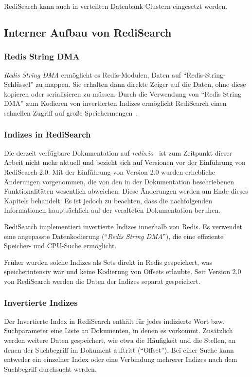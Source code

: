 RediSearch kann auch in verteilten Datenbank-Clustern eingesetzt werden.
\subsection{Interner Aufbau von RediSearch}
\subsubsection{Redis String DMA} %
\emph{Redis String DMA} ermöglicht es Redis-Modulen, Daten auf \enquote{Redis-String-Schlüssel} zu mappen. Sie erhalten dann direkte Zeiger auf die Daten, ohne diese kopieren oder serialisieren zu müssen.
Durch die Verwendung von \enquote{Redis String DMA} zum Kodieren von invertierten Indizes ermöglicht RediSearch einen schnellen Zugriff auf große Speichermengen~\cite{redis_ltd_internal_nodate}.


\subsubsection{Indizes in RediSearch}
Die derzeit verfügbare Dokumentation auf \emph{redis.io}~\cite{redis_ltd_internal_nodate} ist zum Zeitpunkt dieser Arbeit nicht mehr aktuell und bezieht sich auf Versionen vor der Einführung von RediSearch 2.0.
Mit der Einführung von Version 2.0 wurden erhebliche Änderungen vorgenommen, die von den in der Dokumentation beschriebenen Funktionalitäten wesentlich abweichen.
Diese Änderungen werden am Ende dieses Kapitels behandelt.
Es ist jedoch zu beachten, dass die nachfolgenden Informationen hauptsächlich auf der veralteten Dokumentation beruhen.

RediSearch implementiert invertierte Indizes innerhalb von Redis.
Es verwendet eine angepasste Datenkodierung (\enquote{\emph{Redis String DMA}}), die eine effiziente Speicher- und CPU-Suche ermöglicht.

Früher wurden solche Indizes als Sets direkt in Redis gespeichert, was speicherintensiv war und keine Kodierung von Offsets erlaubte. Seit Version 2.0 von RediSearch werden die Daten der Indizes separat gespeichert.

\subsubsection{Invertierte Indizes}
Der Invertierte Index in RediSearch enthält für jedes indizierte Wort bzw. Suchparameter eine Liste an Dokumenten, in denen es vorkommt.
Zusätzlich werden weitere Daten gespeichert, wie etwa die Häufigkeit und die Stellen, an denen der Suchbegriff im Dokument auftritt (\enquote{Offset}).
Bei einer Suche kann entweder ein einzelner Index oder eine Verbindung mehrerer Indizes nach dem Suchbegriff durchsucht werden.

